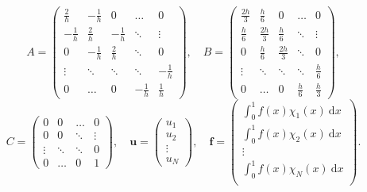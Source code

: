 \documentclass[a4paper]{article}
\newcommand{\dd}{\mathrm{d}}
\newcommand{\vct}{\mathbf}
\begin{document}
\begin{equation*}
  A = \begin{pmatrix}
        \frac{2}{h}   & - \frac{1}{h} & 0             & \hdots        & 0             \\
        - \frac{1}{h} & \frac{2}{h}   & - \frac{1}{h} &  \ddots       & \vdots        \\
        0             & - \frac{1}{h} & \frac{2}{h}   & \ddots        & 0             \\
        \vdots        & \ddots        & \ddots        & \ddots        & - \frac{1}{h} \\
        0             & \hdots        & 0             & - \frac{1}{h} & \frac{1}{h}
      \end{pmatrix},
  \quad
  B = \begin{pmatrix}
        \frac{2h}{3}  & \frac{h}{6}   & 0             & \hdots      & 0           \\
        \frac{h}{6}   & \frac{2h}{3}  & \frac{h}{6}   & \ddots      & \vdots      \\
        0             & \frac{h}{6}   & \frac{2h}{3}  & \ddots      & 0           \\
        \vdots        & \ddots        & \ddots        & \ddots      & \frac{h}{6} \\
        0             & \hdots        & 0             & \frac{h}{6} & \frac{h}{3}
      \end{pmatrix},
\end{equation*}
\begin{equation*}
  C = \begin{pmatrix}
        0       & 0       & \hdots  & 0       \\
        0       & 0       & \ddots  & \vdots  \\
        \vdots  & \ddots  & \ddots  & 0       \\
        0       & \hdots  & 0       & 1
      \end{pmatrix},
  \quad
  \vct{u} = \begin{pmatrix}
              u_1 \\
              u_2 \\
              \vdots \\
              u_N
            \end{pmatrix},
  \quad
  \vct{f} = \begin{pmatrix}
              \int^1_0 f(x) \chi_1(x) \ \dd x \\
              \int^1_0 f(x) \chi_2(x) \ \dd x \\
              \vdots \\
              \int^1_0 f(x) \chi_N(x) \ \dd x \\
            \end{pmatrix}.
\end{equation*}
\end{document}
